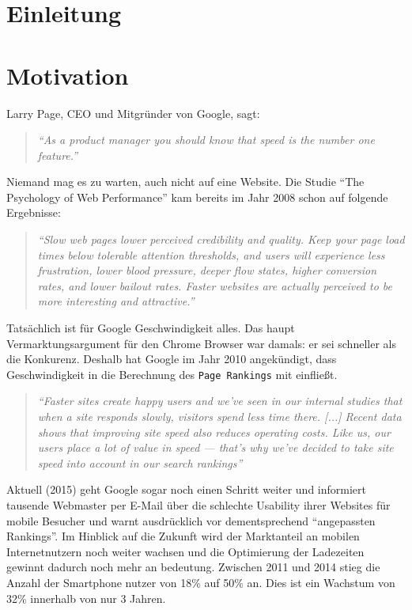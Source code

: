\section{Einleitung} %
\label{sec:einleitung}




\section{Motivation} %
\label{sub:motivation}

	Larry Page, CEO und Mitgründer von Google, sagt:
	\begin{quote}
		\textit{"`As a product manager you should know that speed is the number one feature."'}\autocite{}
	\end{quote}
	Niemand mag es zu warten, auch nicht auf eine Website. Die Studie "`The Psychology of Web Performance"' kam bereits im Jahr 2008 schon auf folgende Ergebnisse:

	\begin{quote}\itshape
		"`Slow web pages lower perceived credibility and quality. Keep your page load times below tolerable attention thresholds, and users will experience less frustration, lower blood pressure, deeper flow states, higher conversion rates, and lower bailout rates. Faster websites are actually perceived to be more interesting and attractive."' \autocite{webOpti08}
	\end{quote}

	Tatsächlich ist für Google Geschwindigkeit alles. Das haupt Vermarktungsargument für den Chrome Browser war damals: er sei schneller als die Konkurenz.	Deshalb hat Google im Jahr 2010 angekündigt, dass Geschwindigkeit in die Berechnung des \texttt{Page Rankings} mit einfließt.

	\begin{quote}\itshape
		"`Faster sites create happy users and we've seen in our internal studies that when a site responds slowly, visitors spend less time there. [...] Recent data shows that improving site speed also reduces operating costs. Like us, our users place a lot of value in speed — that's why we've decided to take site speed into account in our search rankings"'\autocite{google10}
	\end{quote}

	Aktuell (2015) geht Google sogar noch einen Schritt weiter und informiert tausende Webmaster per E-Mail über die schlechte Usability ihrer Websites für mobile Besucher und warnt ausdrücklich vor dementsprechend "`angepassten Rankings"'.\autocite{t3n15}
	Im Hinblick auf die Zukunft wird der Marktanteil an mobilen Internetnutzern noch weiter wachsen und die Optimierung der Ladezeiten gewinnt dadurch noch mehr an bedeutung. Zwischen 2011 und 2014 stieg die Anzahl der Smartphone nutzer von 18\% auf 50\% an. Dies ist ein Wachstum von 32\% innerhalb von nur 3 Jahren.\autocite{tns14}\\

